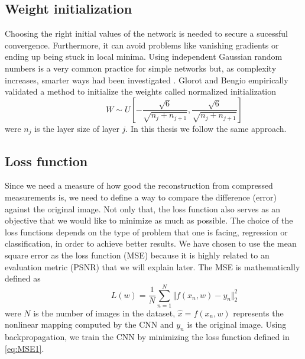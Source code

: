 \FloatBarrier

\subsection{Weight initialization}
Choosing the right initial values of the network is needed to secure a sucessful convergence. Furthermore, it can avoid problems like vanishing gradients or ending up being stuck in local minima. Using independent Gaussian random numbers is a very common practice for simple networks but, as complexity increases, smarter ways had been investigated \cite{glorot2010understanding}. Glorot and Bengio empirically validated a method to initialize the weights called normalized initialization 
\begin{equation} \label{eq:Initw1}
\hspace{3em} \hspace{3em} \hspace{3em} W \sim U [ - \frac{\sqrt{6}}{\sqrt{n_j + n_{j+1}}}, \frac{\sqrt{6}}{\sqrt{n_j + n_{j+1}}} ] \enspace \enspace \hspace{3em}
\end{equation}  
were $n_j$ is the layer size of layer $j$. In this thesis we follow the same approach.   

\FloatBarrier

\subsection{Loss function}
Since we need a measure of how good the reconstruction from compressed measurements is, we need to define a way to compare the difference (error) against the original image. Not only that, the loss function also serves as an objective that we would like to minimize as much as possible. The choice of the loss functions depends on the type of problem that one is facing, regression or classification, in order to achieve better results. We have chosen to use the mean square error as the loss function (MSE) because it is highly related to an evaluation metric (PSNR) that we will explain later. The MSE is mathematically defined as 
\begin{equation} \label{eq:MSE1}
\hspace{3em} \hspace{3em} \hspace{3em} L (w) = \frac{1}{N} \sum\limits_{n=1}^N \Vert f(x_n,w) - y_n\Vert_{2}^2 \enspace \enspace \hspace{3em}
\end{equation} 
were $N$ is the number of images in the dataset, $\hat{x} = f(x_n,w)$ represents the nonlinear mapping computed by the CNN and $y_n$ is the original image. Using backpropagation, we train the CNN by minimizing the loss function defined in \ref{eq:MSE1}.  

